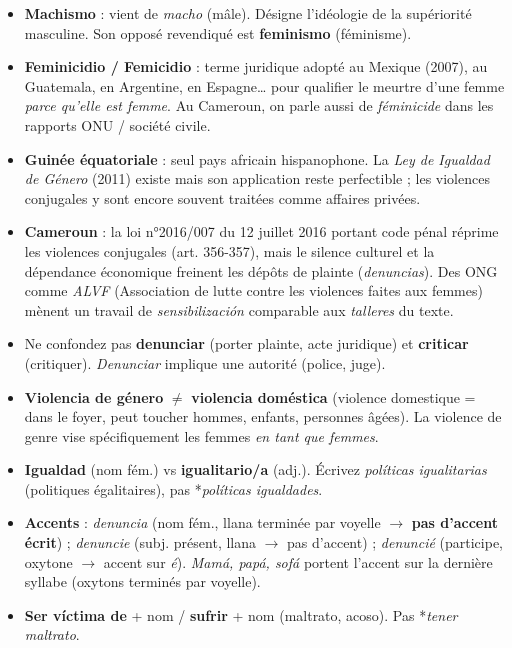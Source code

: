 \documentclass[11pt]{article}
\begin{document}
\begin{savaistu}
\begin{itemize}
\item \textbf{Machismo} : vient de \emph{macho} (mâle). Désigne l'idéologie de la supériorité masculine. Son opposé revendiqué est \textbf{feminismo} (féminisme).
\item \textbf{Feminicidio / Femicidio} : terme juridique adopté au Mexique (2007), au Guatemala, en Argentine, en Espagne… pour qualifier le meurtre d'une femme \emph{parce qu'elle est femme}. Au Cameroun, on parle aussi de \emph{féminicide} dans les rapports ONU / société civile.
\item \textbf{Guinée équatoriale} : seul pays africain hispanophone. La \emph{Ley de Igualdad de Género} (2011) existe mais son application reste perfectible ; les violences conjugales y sont encore souvent traitées comme affaires privées.
\item \textbf{Cameroun} : la loi n°2016/007 du 12 juillet 2016 portant code pénal réprime les violences conjugales (art. 356-357), mais le silence culturel et la dépendance économique freinent les dépôts de plainte (\emph{denuncias}). Des ONG comme \emph{ALVF} (Association de lutte contre les violences faites aux femmes) mènent un travail de \emph{sensibilización} comparable aux \emph{talleres} du texte.
\end{itemize}
\end{savaistu}

\begin{attention}
\begin{itemize}
\item Ne confondez pas \textbf{denunciar} (porter plainte, acte juridique) et \textbf{criticar} (critiquer). \emph{Denunciar} implique une autorité (police, juge).
\item \textbf{Violencia de género} $\neq$ \textbf{violencia doméstica} (violence domestique = dans le foyer, peut toucher hommes, enfants, personnes âgées). La violence de genre vise spécifiquement les femmes \emph{en tant que femmes}.
\item \textbf{Igualdad} (nom fém.) vs \textbf{igualitario/a} (adj.). Écrivez \emph{políticas igualitarias} (politiques égalitaires), pas *\emph{políticas igualdades}.
\item \textbf{Accents} : \emph{denuncia} (nom fém., llana terminée par voyelle $\to$ \textbf{pas d'accent écrit}) ; \emph{denuncie} (subj. présent, llana $\to$ pas d'accent) ; \emph{denuncié} (participe, oxytone $\to$ accent sur \emph{é}). \emph{Mamá, papá, sofá} portent l'accent sur la dernière syllabe (oxytons terminés par voyelle).
\item \textbf{Ser víctima de} + nom / \textbf{sufrir} + nom (maltrato, acoso). Pas *\emph{tener maltrato}.
\end{itemize}
\end{attention}
\end{document}
